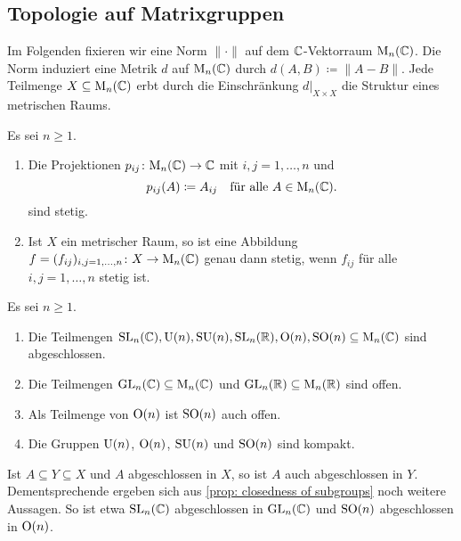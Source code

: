 \subsection{Topologie auf Matrixgruppen}


Im Folgenden fixieren wir eine Norm $\|\cdot\|$ auf dem $\mathbb{C}$-Vektorraum $\mathrm{M}_n(\mathbb{C})$.
Die Norm induziert eine Metrik $d$ auf $\mathrm{M}_n(\mathbb{C})$ durch $d(A,B) \coloneqq \|A-B\|$.
Jede Teilmenge $X \subseteq \mathrm{M}_n(\mathbb{C})$ erbt durch die Einschränkung $d|_{X \times X}$ die Struktur eines metrischen Raums.


\begin{lemma}
  Es sei $n \geq 1$.
  \begin{enumerate}[leftmargin=*, label=\roman*)]
    \item
      Die Projektionen $p_{ij} \colon \mathrm{M}_n(\mathbb{C}) \to \mathbb{C}$ mit $i,j = 1, \dotsc, n$ und
      \[
        p_{ij}(A) \coloneqq A_{ij}
        \quad
        \text{für alle $A \in \mathrm{M}_n(\mathbb{C})$}.
      \]
      sind stetig.
    \item
      Ist $X$ ein metrischer Raum, so ist eine Abbildung $f = (f_{ij})_{i,j = 1, \dotsc, n} \colon X \to \mathrm{M}_n(\mathbb{C})$ genau dann stetig, wenn $f_{ij}$ für alle $i, j = 1, \dotsc, n$ stetig ist.
 \end{enumerate}
\end{lemma}


\begin{theorem}\label{prop: closedness of subgroups}
  Es sei $n \geq 1$.
  \begin{enumerate}[leftmargin=*, label=\roman*)]
    \item
      Die Teilmengen $\mathrm{SL}_n(\mathbb{C}), \mathrm{U}(n), \mathrm{SU}(n), \mathrm{SL}_n(\mathbb{R}), \mathrm{O}(n), \mathrm{SO}(n) \subseteq \mathrm{M}_n(\mathbb{C})$ sind abgeschlossen.
    \item
      Die Teilmengen $\mathrm{GL}_n(\mathbb{C}) \subseteq \mathrm{M}_n(\mathbb{C})$ und $\mathrm{GL}_n(\mathbb{R}) \subseteq \mathrm{M}_n(\mathbb{R})$ sind offen.
    \item
      Als Teilmenge von $\mathrm{O}(n)$ ist $\mathrm{SO}(n)$ auch offen.
    \item
      Die Gruppen $\mathrm{U}(n)$, $\mathrm{O}(n)$, $\mathrm{SU}(n)$ und $\mathrm{SO}(n)$ sind kompakt.
  \end{enumerate}
\end{theorem}


\begin{remark}
  Ist $A \subseteq Y \subseteq X$ und $A$ abgeschlossen in $X$, so ist $A$ auch abgeschlossen in $Y$.
  Dementsprechende ergeben sich aus \ref{prop: closedness of subgroups} noch weitere Aussagen.
  So ist etwa $\mathrm{SL}_n(\mathbb{C})$ abgeschlossen in $\mathrm{GL}_n(\mathbb{C})$ und $\mathrm{SO}(n)$ abgeschlossen in $\mathrm{O}(n)$.
\end{remark}



